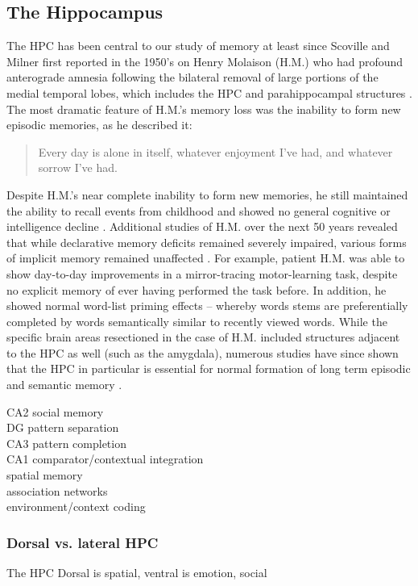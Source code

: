\subsection{The Hippocampus}\label{sec:intro:memory:hpc}
The \ac{HPC} has been central to our study of memory at least since Scoville and Milner first reported in the 1950's on Henry Molaison (H.M.) who had profound anterograde amnesia following the bilateral removal of large portions of the medial temporal lobes, which includes the \ac{HPC} and parahippocampal structures \citep{Scoville1957}.
The most dramatic feature of H.M.'s memory loss was the inability to form new episodic memories, as he described it:
\begin{quote}
Every day is alone in itself, whatever enjoyment I've had, and whatever sorrow I've had.
\end{quote}
Despite H.M.'s near complete inability to form new memories, he still maintained the ability to recall events from childhood and showed no general cognitive or intelligence decline \citep{Squire2009}.
Additional studies of H.M. over the next 50 years revealed that while declarative memory deficits remained severely impaired, various forms of implicit memory remained unaffected \citep{Corkin2002}.
For example, patient H.M. was able to show day-to-day improvements in a mirror-tracing motor-learning task, despite no explicit memory of ever having performed the task before.
In addition, he showed normal word-list priming effects -- whereby words stems are preferentially completed by words semantically similar to recently viewed words. 
While the specific brain areas resectioned in the case of H.M. included structures adjacent to the \ac{HPC} as well (such as the amygdala), numerous studies have since shown that the \ac{HPC} in particular is essential for normal formation of long term episodic and semantic memory \citep[reviewd in][]{Eichenbaum2000, Burgess2002}.

CA2 social memory \\
DG pattern separation \\
CA3 pattern completion \\
CA1 comparator/contextual integration \\
spatial memory \\
association networks \\
environment/context coding

\subsubsection{Dorsal vs. lateral HPC}
The \ac{HPC}
\citep{Strange2014}
Dorsal is spatial, ventral is emotion, social
